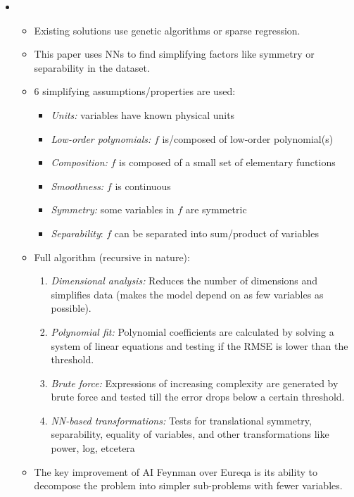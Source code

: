 \documentclass[fleqn,10pt]{olplainarticle}
\begin{document}
\begin{itemize}
    \item {}
          \begin{itemize}
              \item Existing solutions use genetic algorithms or sparse regression.
              \item This paper uses NNs to find simplifying factors like symmetry or separability in the dataset.
              \item 6 simplifying assumptions/properties are used:
                    \begin{itemize}
                        \item \emph{Units:} variables have known physical units
                        \item \emph{Low-order polynomials:} $f$ is/composed of low-order polynomial(s)
                        \item \emph{Composition:} $f$ is composed of a small set of elementary functions
                        \item \emph{Smoothness:} $f$ is continuous
                        \item \emph{Symmetry:} some variables in $f$ are symmetric
                        \item \emph{Separability}: $f$ can be separated into sum/product of variables
                    \end{itemize}
              \item Full algorithm (recursive in nature):
                    \begin{enumerate}
                        \item \emph{Dimensional analysis:} Reduces the number of dimensions and simplifies data  (makes the model depend on as few variables as possible).
                        \item \emph{Polynomial fit:} Polynomial coefficients are calculated by solving a system of linear equations and testing if the RMSE is lower than the threshold.
                        \item \emph{Brute force:} Expressions of increasing complexity are generated by brute force and tested till the error drops below a certain threshold.
                        \item \emph{NN-based transformations:} Tests for translational symmetry, separability, equality of variables, and other transformations like power, log, etcetera
                    \end{enumerate}
              \item The key improvement of AI Feynman over Eureqa is its ability to decompose the problem into simpler sub-problems with fewer variables.
          \end{itemize}


\end{itemize}
\end{document}
